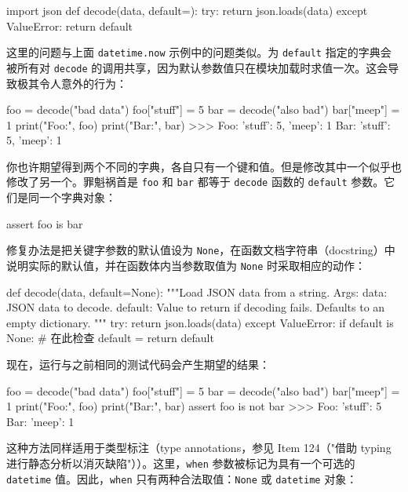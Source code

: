 \begin{codebox}[python]
import json
def decode(data, default={}):
    try:
        return json.loads(data)
    except ValueError:
        return default
\end{codebox}

这里的问题与上面 \texttt{datetime.now} 示例中的问题类似。为 \texttt{default} 指定的字典会被所有对 \texttt{decode} 的调用共享，因为默认参数值只在模块加载时求值一次。这会导致极其令人意外的行为：

\begin{codebox}[python]
foo = decode("bad data")
foo["stuff"] = 5
bar = decode("also bad")
bar["meep"] = 1
print("Foo:", foo)
print("Bar:", bar)
>>>
Foo: {'stuff': 5, 'meep': 1}
Bar: {'stuff': 5, 'meep': 1}
\end{codebox}

你也许期望得到两个不同的字典，各自只有一个键和值。但是修改其中一个似乎也修改了另一个。罪魁祸首是 \texttt{foo} 和 \texttt{bar} 都等于 \texttt{decode} 函数的 \texttt{default} 参数。它们是同一个字典对象：

\begin{codebox}[python]
assert foo is bar
\end{codebox}

修复办法是把关键字参数的默认值设为 \texttt{None}，在函数文档字符串（docstring）中说明实际的默认值，并在函数体内当参数取值为 \texttt{None} 时采取相应的动作：

\begin{codebox}[python]
def decode(data, default=None):
    """Load JSON data from a string.
    Args:
        data: JSON data to decode.
        default: Value to return if decoding fails.
            Defaults to an empty dictionary.
    """
    try:
        return json.loads(data)
    except ValueError:
        if default is None:  # 在此检查
            default = {}
        return default
\end{codebox}

现在，运行与之前相同的测试代码会产生期望的结果：

\begin{codebox}[python]
foo = decode("bad data")
foo["stuff"] = 5
bar = decode("also bad")
bar["meep"] = 1
print("Foo:", foo)
print("Bar:", bar)
assert foo is not bar
>>>
Foo: {'stuff': 5}
Bar: {'meep': 1}
\end{codebox}

这种方法同样适用于类型标注（type annotations，参见 Item 124（"借助 typing 进行静态分析以消灭缺陷"））。这里，\texttt{when} 参数被标记为具有一个可选的 \texttt{datetime} 值。因此，\texttt{when} 只有两种合法取值：\texttt{None} 或 \texttt{datetime} 对象：


